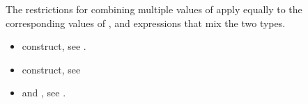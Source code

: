 The restrictions for combining multiple values of  apply equally to the
corresponding values of , and expressions that mix the two types.

\crossreferences
\begin{itemize}
\item {} construct, see .

\item {} construct, see

\item {} and
  , see
.
\end{itemize}
